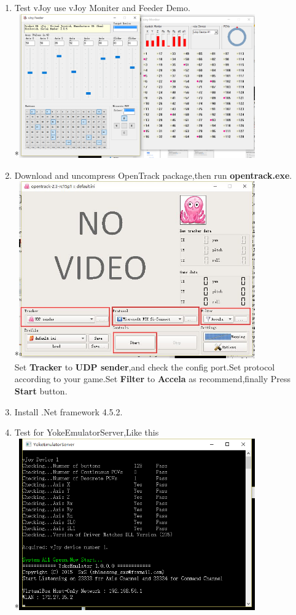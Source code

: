 \documentclass[12pt,a4paper]{article}
\begin{document}
\begin{CJK}{UTF8}{gbsn}
\begin{enumerate}
\item Test vJoy use vJoy Moniter and Feeder Demo.
\\*\includegraphics[width=4in]{install_test_yoke.png}
\item Download and uncompress OpenTrack package,then run \textbf{opentrack.exe}.
\\*\includegraphics[width=4in]{install_opentrack.jpg}
\\Set \textbf{Tracker} to \textbf{UDP sender},and check the config port.Set protocol according to your game.Set \textbf{Filter} to \textbf{Accela} as recommend,finally Press \textbf{Start} button.
\item Install .Net framework 4.5.2.
\item Test for YokeEmulatorServer,Like this
\\*\includegraphics[width=4in]{install_finish_server.png}

\end{enumerate}
\end{CJK}
\end{document}
